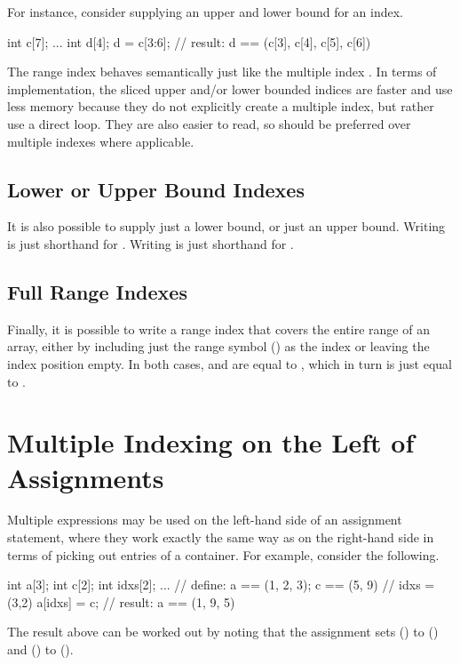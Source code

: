 For instance, consider supplying an upper and lower bound for an
index.
%
\begin{stancode}
int c[7];
...
int d[4];
d = c[3:6];  // result: d == (c[3], c[4], c[5], c[6])
\end{stancode}
%
The range index  behaves semantically just like the multiple
index .  In terms of implementation, the sliced
upper and/or lower bounded indices are faster and use less memory 
because they do not explicitly create a multiple index, but rather use
a direct loop.  They are also easier to read, so should be preferred
over multiple indexes where applicable.

\subsection{Lower or Upper Bound Indexes}

It is also possible to supply just a lower bound, or just an upper
bound.  Writing  is just shorthand for
.  Writing  is just shorthand for 
.  

\subsection{Full Range Indexes}

Finally, it is possible to write a range index that covers the entire
range of an array, either by including just the range symbol
(\code{:}) as the index or leaving the index position empty. In both
cases,  and  are equal to ,
which in turn is just equal to .

\section{Multiple Indexing on the Left of Assignments}

Multiple expressions may be used on the left-hand side of an
assignment statement, where they work exactly the same way as on the
right-hand side in terms of picking out entries of a container.  
For example, consider the following.
%
\begin{stancode}
int a[3];
int c[2];
int idxs[2];
...             // define: a == (1, 2, 3);  c == (5, 9)
                //         idxs = (3,2)
a[idxs] = c;   // result: a == (1, 9, 5)
\end{stancode}
%
The result above can be worked out by noting that the assignment sets
 () to  () and
 () to  (). 

